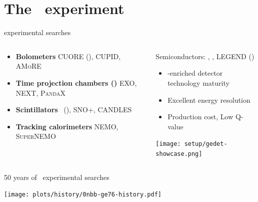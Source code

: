 \documentclass[10pt,aspectratio=169]{beamer}
\newcommand{\cmark}{\textcolor{mLightGreen}{\ding{51}}}
\newcommand{\xmark}{\textcolor{mLightBrown}{\ding{55}}}
\begin{document}
\section{The \gerda\ experiment}
\begin{frame}{\texorpdfstring{\onbb}{0νββ} experimental searches}
  \begin{columns}
    \begin{column}{0.5\textwidth}
      \begin{itemize}
        \item \textbf{Bolometers} CUORE (), CUPID, \textsc{AMoRE}
        \item \textbf{Time projection chambers ()} EXO, NEXT, \textsc{PandaX}
        \item \textbf{Scintillators} \kamlandzen\ (), SNO+, CANDLES
        \item \textbf{Tracking calorimeters} NEMO, \textsc{SuperNEMO}
      \end{itemize}
    \end{column}
    \begin{column}{0.5\textwidth}
      \begin{alertblock}{Semiconductors: \gerda, \majoranademo, LEGEND (\gesix)}
        \begin{itemize}\small
          \item[\cmark] \gesix-enriched detector technology maturity
          \item[\cmark] Excellent energy resolution
          \item[\xmark] Production cost, Low Q-value
        \end{itemize}
      \end{alertblock}
      \begin{center}
        \texttt{[image: setup/gedet-showcase.png]}
      \end{center}
    \end{column}
  \end{columns}
\end{frame}
\begin{frame}{50 years of \gesix\ experimental \texorpdfstring{\onbb}{0νββ} searches}
  \begin{center}
    \texttt{[image: plots/history/0nbb-ge76-history.pdf]}
  \end{center}
\end{frame}
\end{document}
